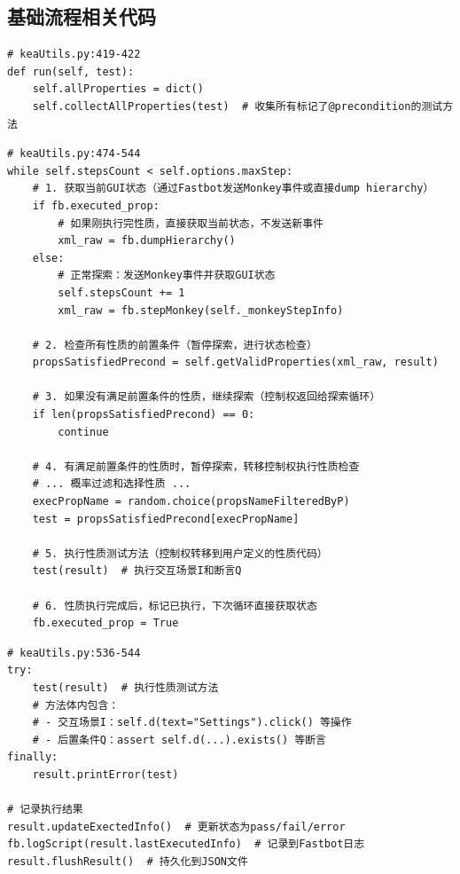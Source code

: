 \documentclass[a4paper, zihao=-4]{ctexart}
\begin{document}
\subsection{基础流程相关代码}

\begin{lstlisting}[label=code:collect_init, caption=性质收集初始化]
# keaUtils.py:419-422
def run(self, test):
    self.allProperties = dict()
    self.collectAllProperties(test)  # 收集所有标记了@precondition的测试方法
\end{lstlisting}

\begin{lstlisting}[label=code:main_loop_logic, caption=主循环调度逻辑]
# keaUtils.py:474-544
while self.stepsCount < self.options.maxStep:
    # 1. 获取当前GUI状态（通过Fastbot发送Monkey事件或直接dump hierarchy）
    if fb.executed_prop:
        # 如果刚执行完性质，直接获取当前状态，不发送新事件
        xml_raw = fb.dumpHierarchy()
    else:
        # 正常探索：发送Monkey事件并获取GUI状态
        self.stepsCount += 1
        xml_raw = fb.stepMonkey(self._monkeyStepInfo)
    
    # 2. 检查所有性质的前置条件（暂停探索，进行状态检查）
    propsSatisfiedPrecond = self.getValidProperties(xml_raw, result)
    
    # 3. 如果没有满足前置条件的性质，继续探索（控制权返回给探索循环）
    if len(propsSatisfiedPrecond) == 0:
        continue
    
    # 4. 有满足前置条件的性质时，暂停探索，转移控制权执行性质检查
    # ... 概率过滤和选择性质 ...
    execPropName = random.choice(propsNameFilteredByP)
    test = propsSatisfiedPrecond[execPropName]
    
    # 5. 执行性质测试方法（控制权转移到用户定义的性质代码）
    test(result)  # 执行交互场景I和断言Q
    
    # 6. 性质执行完成后，标记已执行，下次循环直接获取状态
    fb.executed_prop = True
\end{lstlisting}

\begin{lstlisting}[label=code:exec_record, caption=性质执行与记录]
# keaUtils.py:536-544
try:
    test(result)  # 执行性质测试方法
    # 方法体内包含：
    # - 交互场景I：self.d(text="Settings").click() 等操作
    # - 后置条件Q：assert self.d(...).exists() 等断言
finally:
    result.printError(test)

# 记录执行结果
result.updateExectedInfo()  # 更新状态为pass/fail/error
fb.logScript(result.lastExecutedInfo)  # 记录到Fastbot日志
result.flushResult()  # 持久化到JSON文件
\end{lstlisting}
\end{document}
